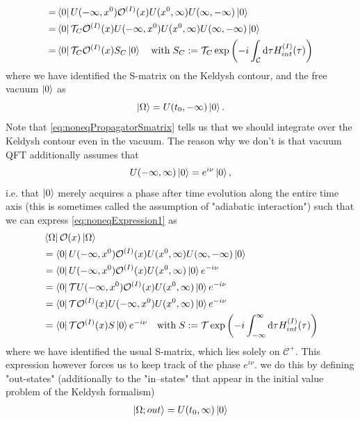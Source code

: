 \begin{enumerate}
\begin{subequations}
\begin{align}
	=&\bra{0} U(-\infty,x^0) \mathcal{O}^{(I)}(x) U(x^0,\infty) U(\infty,-\infty) \ket{0}\label{eq:noneqExpression1}\\
	=&\bra{0} \mathcal{T}_C \mathcal{O}^{(I)}(x) U(-\infty,x^0) U(x^0,\infty) U(\infty,-\infty) \ket{0}\\
	=&\bra{0}\mathcal{T}_C \mathcal{O}^{(I)} (x) S_C \ket{0} \quad \mathrm{with\;}S_C:= \mathcal{T}_C \exp\left(-i \int_{\mathcal{C}} \mathrm{d} \tau H^{(I)}_{int} (\tau)\right) 	\label{eq:noneqPropagatorSmatrix}
\end{align}
\end{subequations}
where we have identified the S-matrix on the Keldysh contour, and the free vacuum $\ket{0}$ as 
\begin{equation*}
	\ket{\Omega} = U(t_0,-\infty) \ket{0}.
\end{equation*}
Note that \ref{eq:noneqPropagatorSmatrix} tells us that we should integrate over the Keldysh contour even in the vacuum. The reason why we don't is that vacuum QFT additionally assumes that
\begin{equation*}
	U(-\infty,\infty)\ket{0} = e^{i\nu} \ket{0},
\end{equation*}
i.e. that $\ket{0}$ merely acquires a phase after time evolution along the entire time axis (this is sometimes called the assumption of "adiabatic interaction") such that we can express \ref{eq:noneqExpression1} as
\begin{align*}
	&\bra{\Omega}\mathcal{O}(x) \ket{\Omega} \\
	&= \bra{0}U(-\infty,x^0) \mathcal{O}^{(I)}(x) U(x^0,\infty) U(\infty,-\infty) \ket{0}\\
	&=  \bra{0} U(-\infty,x^0) \mathcal{O}^{(I)}(x) U(x^0,\infty) \ket{0}e^{-i \nu} \\
	&= \bra{0}\mathcal{T} U(-\infty,x^0) \mathcal{O}^{(I)}(x) U(x^0,\infty)\ket{0} e^{-i\nu} \\
	&= \bra{0}\mathcal{T}\mathcal{O}^{(I)}(x) U(-\infty,x^0) U(x^0,\infty) \ket{0}e^{-i \nu} \\
	&=\bra{0}\mathcal{T}\mathcal{O}^{(I)}(x) S\ket{0} e^{-i\nu} \quad \mathrm{with}\; S:= \mathcal{T}\exp\left(- i \int_{-\infty}^{\infty}  \mathrm{d} \tau H^{(I)}_{int}(\tau) \right)
\end{align*}
where we have identified the usual S-matrix, which lies solely on $\mathcal{C}^+$. This expression however forces us to keep track of the phase $e^{i\nu}$. we do this by defining "out-states" (additionally to the "in--states" that appear in the initial value problem of the Keldysh formalism)
\begin{align*}
	\ket{\Omega;out} &= U(t_0,\infty)\ket{0}\\

\end{align*}
\end{enumerate}
